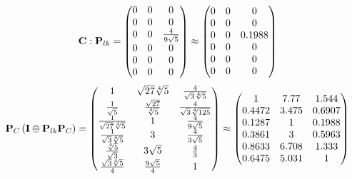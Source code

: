 \documentclass[10pt,a4paper]{article}
\begin{document}
	\[
		\bold{C}: \bold{P}_{lk} = 
		\begin{pmatrix}
			{{0}} {} & {{0}} {} & {{0}} {} \\
			{{0}} {} & {{0}} {} & {{0}} {} \\
			{{0}} {} & {{0}} {} & \frac{{4}} {{9}\sqrt{5}} \\
			{{0}} {} & {{0}} {} & {{0}} {} \\
			{{0}} {} & {{0}} {} & {{0}} {} \\
			{{0}} {} & {{0}} {} & {{0}} {} \\
		\end{pmatrix}
		\approx
		\begin{pmatrix}
			0        & 0        & 0        \\
			0        & 0        & 0        \\
			0        & 0        & 0.1988   \\
			0        & 0        & 0        \\
			0        & 0        & 0        \\
			0        & 0        & 0        \\
		\end{pmatrix}
	\]
	\[
		\bold{P}_{C}\left(\bold{I} \oplus \bold{P}_{lk}\bold{P}_{C}\right) = 
		\begin{pmatrix}
			{1} {} & {\sqrt{27}\sqrt[4]{5}} {} & \frac{{4}} {\sqrt{3}\sqrt[4]{5}} \\
			\frac{1} {\sqrt{5}} & \frac{\sqrt{27}} {\sqrt[4]{5}} & \frac{{4}} {\sqrt{3}\sqrt[4]{125}} \\
			\frac{1} {\sqrt{27}\sqrt[4]{5}} & {1} {} & \frac{{4}} {{9}\sqrt{5}} \\
			\frac{1} {\sqrt{3}\sqrt[4]{5}} & {{3}} {} & \frac{{4}} {{3}\sqrt{5}} \\
			\frac{\sqrt[4]{5}} {\sqrt{3}} & {{3}\sqrt{5}} {} & \frac{{4}} {{3}} \\
			\frac{\sqrt{3}\sqrt[4]{5}} {{4}} & \frac{{9}\sqrt{5}} {{4}} & {1} {} \\
		\end{pmatrix}
		\approx
		\begin{pmatrix}
			1        & 7.77     & 1.544    \\
			0.4472   & 3.475    & 0.6907   \\
			0.1287   & 1        & 0.1988   \\
			0.3861   & 3        & 0.5963   \\
			0.8633   & 6.708    & 1.333    \\
			0.6475   & 5.031    & 1        \\
		\end{pmatrix}
	\]
\end{document}
